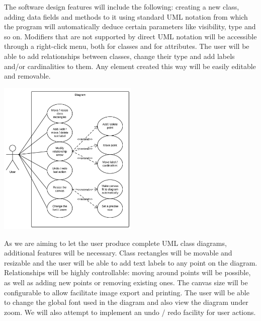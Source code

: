 The software design features will include the following: creating a new class, adding data fields and methods to it using standard UML notation from which the program will automatically deduce certain parameters like visibility, type and so on. Modifiers that are not supported by direct UML notation will be accessible through a right-click menu, both for classes and for attributes. The user will be able to add relationships between classes, change their type and add labels and/or cardinalities to them. Any element created this way will be easily editable and removable.

\vspace{-10pt}
\begin{center}
	\includegraphics[width=0.5\textwidth]{DiagramUseCase.png}
\end{center}
\vspace{-10pt}

As we are aiming to let the user produce complete UML class diagrams, additional features will be necessary. Class rectangles will be movable and resizable and the user will be able to add text labels to any point on the diagram. Relationships will be highly controllable: moving around points will be possible, as well as adding new points or removing existing ones. The canvas size will be configurable to allow facilitate image export and printing. The user will be able to change the global font used in the diagram and also view the diagram under zoom. We will also attempt to implement an undo / redo facility for user actions.
